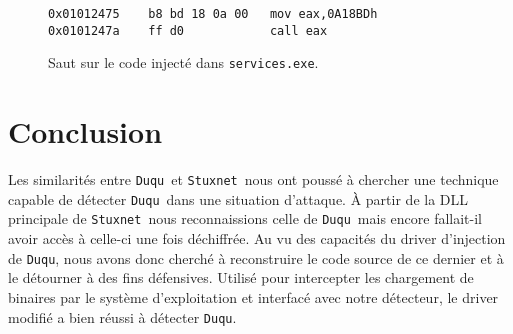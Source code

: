 \documentclass[times,11pt,fullpage]{article}
\newcommand{\Duqu}{\texttt{Duqu}}
\newcommand{\Stuxnet}{\texttt{Stuxnet}}
\newcommand{\service}{\texttt{services.exe}}
\begin{document}
\begin{figure}
\scriptsize
\begin{framed}
\begin{verbatim}
0x01012475    b8 bd 18 0a 00   mov eax,0A18BDh 
0x0101247a    ff d0            call eax
\end{verbatim}
\end{framed}
\caption{Saut sur le code injecté dans \texttt{\service}.\label{fig:hook}}
\end{figure}

\clearpage
\section{Conclusion}
Les similarités entre \Duqu\ et \Stuxnet\ nous ont poussé à chercher une technique capable de détecter \Duqu\ dans une situation d'attaque. À partir de la DLL principale de \Stuxnet\ nous reconnaissions celle de \Duqu\ mais encore fallait-il avoir accès à celle-ci une fois déchiffrée. Au vu des capacités du driver d'injection de \Duqu, nous avons donc cherché à reconstruire le code source de ce dernier et à le détourner à des fins défensives. Utilisé pour intercepter les chargement de binaires par le système d'exploitation et interfacé avec notre détecteur, le driver modifié a bien réussi à détecter \Duqu.


\nocite{*}
%  

 
\end{document}
